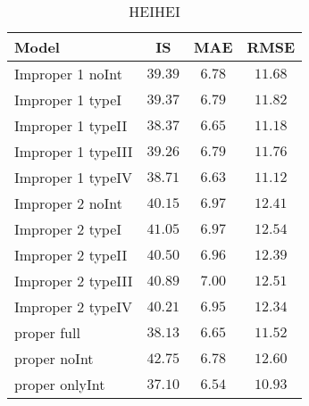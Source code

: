 \begin{table}

\caption{\label{tab:mae-rmse-is}HEIHEI}
\centering
\begin{tabular}{lccc}
\hline
Model  & IS & MAE & \multicolumn{1}{c}{RMSE} \\ 
\hline
Improper 1 noInt  & $39.39$ & $6.78$ & $11.68$ \\
Improper 1 typeI  & $39.37$ & $6.79$ & $11.82$ \\
Improper 1 typeII  & $38.37$ & $6.65$ & $11.18$ \\
Improper 1 typeIII  & $39.26$ & $6.79$ & $11.76$ \\
Improper 1 typeIV  & $38.71$ & $6.63$ & $11.12$ \\
Improper 2 noInt  & $40.15$ & $6.97$ & $12.41$ \\
Improper 2 typeI  & $41.05$ & $6.97$ & $12.54$ \\
Improper 2 typeII  & $40.50$ & $6.96$ & $12.39$ \\
Improper 2 typeIII  & $40.89$ & $7.00$ & $12.51$ \\
Improper 2 typeIV  & $40.21$ & $6.95$ & $12.34$ \\
proper full  & $38.13$ & $6.65$ & $11.52$ \\
proper noInt  & $42.75$ & $6.78$ & $12.60$ \\
proper onlyInt  & $37.10$ & $6.54$ & $10.93$ \\
\hline 
\end{tabular}


\end{table}